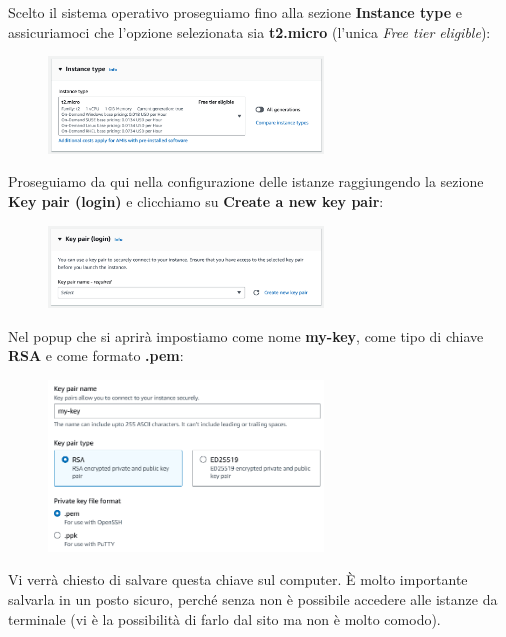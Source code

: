 Scelto il sistema operativo proseguiamo fino alla sezione \textbf{Instance type} e assicuriamoci che l'opzione selezionata sia \textbf{t2.micro} (l'unica \textit{Free tier eligible}):

\begin{figure}[H]
    \centering
    \includegraphics[width=0.65\textwidth]{images/instance-type.png}
\end{figure}

Proseguiamo da qui nella configurazione delle istanze raggiungendo la sezione \textbf{Key pair (login)} e clicchiamo su \textbf{Create a new key pair}:

\begin{figure}[H]
    \centering
    \includegraphics[width=0.65\textwidth]{images/key-pair.png}
\end{figure}

Nel popup che si aprirà impostiamo come nome \textbf{my-key}, come tipo di chiave \textbf{RSA} e come formato \textbf{.pem}:

\begin{figure}[H]
    \centering
    \includegraphics[width=0.65\textwidth]{images/key-creation.png}
\end{figure}

Vi verrà chiesto di salvare questa chiave sul computer. È molto importante salvarla in un posto sicuro, perché senza non è possibile accedere alle istanze da terminale (vi è la possibilità di farlo dal sito ma non è molto comodo).

